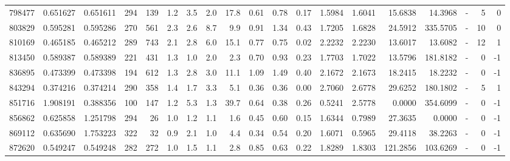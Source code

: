 \begin{tabular}{rrrrrrrrrrrrrrrrlrr}
    798477 & 0.651627 &   0.651611 &  294 &  139 &      1.2 &      3.5 &     2.0 &     17.8 &       0.61 &        0.78 &        0.17 &  1.5984 &  1.6041 &   15.6838 &   14.3968 &             - &        5 &          0 \\
    803829 & 0.595281 &   0.595286 &  270 &  561 &      2.3 &      2.6 &     8.7 &      9.9 &       0.91 &        1.34 &        0.43 &  1.7205 &  1.6828 &   24.5912 &  335.5705 &             - &       10 &          0 \\
    810169 & 0.465185 &   0.465212 &  289 &  743 &      2.1 &      2.8 &     6.0 &     15.1 &       0.77 &        0.75 &        0.02 &  2.2232 &  2.2230 &   13.6017 &   13.6082 &             - &       12 &          1 \\
    813450 & 0.589387 &   0.589389 &  221 &  431 &      1.3 &      1.0 &     2.0 &      2.3 &       0.70 &        0.93 &        0.23 &  1.7703 &  1.7022 &   13.5796 &  181.8182 &             - &        0 &         -1 \\
    836895 & 0.473399 &   0.473398 &  194 &  612 &      1.3 &      2.8 &     3.0 &     11.1 &       1.09 &        1.49 &        0.40 &  2.1672 &  2.1673 &   18.2415 &   18.2232 &             - &        0 &         -1 \\
    843294 & 0.374216 &   0.374214 &  290 &  358 &      1.4 &      1.7 &     3.3 &      5.1 &       0.36 &        0.36 &        0.00 &  2.7060 &  2.6778 &   29.6252 &  180.1802 &             - &        5 &          1 \\
    851716 & 1.908191 &   0.388356 &  100 &  147 &      1.2 &      5.3 &     1.3 &     39.7 &       0.64 &        0.38 &        0.26 &  0.5241 &  2.5778 &    0.0000 &  354.6099 &             - &        0 &         -1 \\
    856862 & 0.625858 &   1.251798 &  294 &   26 &      1.0 &      1.2 &     1.1 &      1.6 &       0.45 &        0.60 &        0.15 &  1.6344 &  0.7989 &   27.3635 &    0.0000 &             - &        0 &         -1 \\
    869112 & 0.635690 &   1.753223 &  322 &   32 &      0.9 &      2.1 &     1.0 &      4.4 &       0.34 &        0.54 &        0.20 &  1.6071 &  0.5965 &   29.4118 &   38.2263 &             - &        0 &         -1 \\
    872620 & 0.549247 &   0.549248 &  282 &  272 &      1.0 &      1.5 &     1.1 &      2.8 &       0.85 &        0.63 &        0.22 &  1.8289 &  1.8303 &  121.2856 &  103.6269 &             - &        0 &         -1 \\

\end{tabular}
